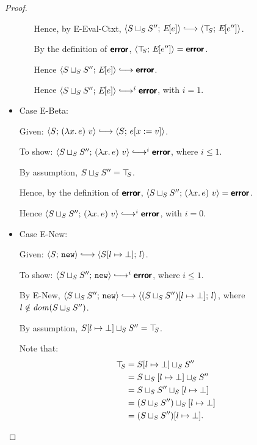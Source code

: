 \begin{proof}
\begin{itemize}
\begin{itemize}
          Hence, by {\sc E-Eval-Ctxt},
          $\config{\lubstore{S}{S''}}{\E{e}} \parstepsto
          \config{\topS}{\E{e''}}$.

          By the definition of $\textbf{\textsf{error}}$, $\langle \top\hspace{-0.85mm}_{S};\, E\hspace{-1mm}\left[e''\right] \rangle =
          \textbf{\textsf{error}}$.

          Hence $\config{\lubstore{S}{S''}}{\E{e}} \parstepsto
          \error$.

          Hence $\config{\lubstore{S}{S''}}{\E{e}} \parstepsto^i
          \error$, with $i = 1$.

      \end{itemize}

    \item Case {\sc E-Beta}:

      Given: $\config{S}{\app{(\lam{x}{e})}{v}} \parstepsto
      \config{S}{\subst{e}{x}{v}}$.

      To show: $\config{\lubstore{S}{S''}}{\app{(\lam{x}{e})}{v}}
      \parstepsto^i \error$, where $i \leq 1$.

      By assumption, $S \sqcup_{S} S'' = \top\hspace{-0.85mm}_{S}$.

      Hence, by the definition of $\textbf{\textsf{error}}$,
      $\langle S \sqcup_{S} S'';\, (\lambda x.\,e)~v \rangle = \textbf{\textsf{error}}$.

      Hence $\config{\lubstore{S}{S''}}{\app{(\lam{x}{e})}{v}}
      \parstepsto^i \error$, with $i = 0$.

    \item Case {\sc E-New}:

      Given: $\config{S}{\NEW} \parstepsto
      \config{\extSRaw{S}{l}{\bot}}{l}$.

      To show: $\config{\lubstore{S}{S''}}{\NEW} \parstepsto^i
      \error$, where $i \leq 1$.

      By {\sc E-New}, $\config{\lubstore{S}{S''}}{\NEW} \parstepsto
      \config{\extSRaw{(\lubstore{S}{S''})}{l}{\bot}}{l}$,
      where $l \notin \mathit{dom}(S \sqcup_{S} S'')$.


      By assumption, $S[l \mapsto \bot] \sqcup_{S} S''
      = \top\hspace{-0.85mm}_{S}$.

      Note that:
      \begin{align*}
        \top\hspace{-0.85mm}_{S} &= S[l \mapsto \bot] \sqcup_{S} S'' \\ &=
        S \sqcup_{S} \left[ l \mapsto \bot \right] \sqcup_{S} S''
        \\ &=
        S \sqcup_{S} S'' \sqcup_{S} \left[ l \mapsto \bot \right]
        \\ &=
        (S \sqcup_{S} S'') \sqcup_{S} \left[ l \mapsto \bot \right]
        \\ &= (S \sqcup_{S} S'')[l \mapsto \bot] .
      \end{align*}


\end{itemize}
\end{proof}
